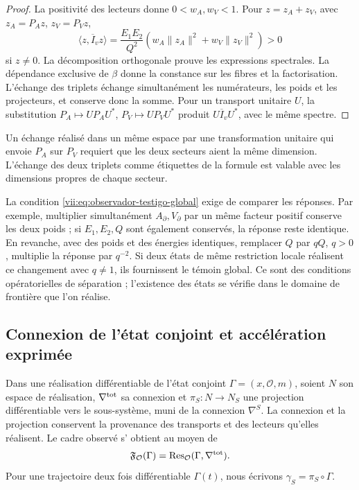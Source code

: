 \begin{proof}
La positivité des lecteurs donne \(0<w_A,w_V<1\). Pour
\(z=z_A+z_V\), avec \(z_A=P_Az\), \(z_V=P_Vz\),
\[
 \langle z,\overline I_vz\rangle
 =\frac{E_1E_2}{Q^2}
   (w_A\|z_A\|^2+w_V\|z_V\|^2)>0
\]
si \(z\neq0\). La décomposition orthogonale prouve les expressions
spectrales. La dépendance exclusive de \(\beta\) donne la constance
sur les fibres et la factorisation. L'échange des triplets
échange simultanément les numérateurs, les poids et les projecteurs, et
conserve donc la somme. Pour un transport unitaire \(U\), la substitution
\(P_A\mapsto UP_AU^*\), \(P_V\mapsto UP_VU^*\) produit
\(U\overline I_vU^*\), avec le même spectre.
\end{proof}

Un échange réalisé dans un même espace par une transformation unitaire
qui envoie \(P_A\) sur \(P_V\) requiert que les deux secteurs aient
la même dimension. L'échange des deux triplets comme étiquettes de la
formule est valable avec les dimensions propres de chaque secteur.

La condition \eqref{vii:eq:observador-testigo-global} exige de comparer les réponses. Par exemple, multiplier simultanément \(A_\partial,V_\partial\) par un même facteur positif conserve les deux poids ; si \(E_1,E_2,Q\) sont également conservés, la réponse reste identique. En revanche, avec des poids et des énergies identiques, remplacer \(Q\) par \(qQ\), \(q>0\), multiplie la réponse par \(q^{-2}\). Si deux états de même restriction locale réalisent ce changement avec \(q\neq1\), ils fournissent le témoin global. Ce sont des conditions opératorielles de séparation ; l'existence des états se vérifie dans le domaine de frontière que l'on réalise.

\subsection{Connexion de l'état conjoint et accélération exprimée}
\label{vii:sec:observador-autoinercia}

Dans une réalisation différentiable de l'état conjoint
\(\Gamma=(x,\mathcal O,m)\), soient \(N\) son espace de réalisation,
\(\nabla^{\rm tot}\) sa connexion et \(\pi_S:N\to N_S\) une
projection différentiable vers le sous-système, muni de la connexion
\(\nabla^S\). La connexion et la projection conservent la provenance
des transports et des lecteurs qu'elles réalisent. Le cadre observé s'
obtient au moyen de
\[
 \mathfrak F_{\mathcal O}(\Gamma)
 =\operatorname{Res}_{\mathcal O}(\Gamma,\nabla^{\rm tot}).
\]
Pour une trajectoire deux fois différentiable \(\Gamma(t)\),
nous écrivons \(\gamma_S=\pi_S\circ\Gamma\).

